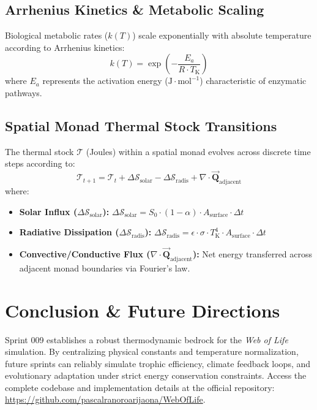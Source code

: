 \documentclass[11pt, a4paper]{article}
\begin{document}
\subsection{Arrhenius Kinetics \& Metabolic Scaling}
Biological metabolic rates ($k(T)$) scale exponentially with absolute temperature according to Arrhenius kinetics:
\begin{equation}
k(T) = \exp\left( -\frac{E_a}{R \cdot T_{\text{K}}} \right)
\end{equation}
where $E_a$ represents the activation energy ($\text{J}\cdot\text{mol}^{-1}$) characteristic of enzymatic pathways.

\subsection{Spatial Monad Thermal Stock Transitions}
The thermal stock $\mathcal{T}$ (Joules) within a spatial monad evolves across discrete time steps according to:
\begin{equation}
\mathcal{T}_{t+1} = \mathcal{T}_{t} + \Delta \mathcal{S}_{\text{solar}} - \Delta \mathcal{S}_{\text{radis}} + \nabla \cdot \vec{\mathbf{Q}}_{\text{adjacent}}
\end{equation}
where:
\begin{itemize}
    \item \textbf{Solar Influx ($\Delta \mathcal{S}_{\text{solar}}$):} $\Delta \mathcal{S}_{\text{solar}} = S_0 \cdot (1 - \alpha) \cdot A_{\text{surface}} \cdot \Delta t$
    \item \textbf{Radiative Dissipation ($\Delta \mathcal{S}_{\text{radis}}$):} $\Delta \mathcal{S}_{\text{radis}} = \epsilon \cdot \sigma \cdot T_{\text{K}}^4 \cdot A_{\text{surface}} \cdot \Delta t$
    \item \textbf{Convective/Conductive Flux ($\nabla \cdot \vec{\mathbf{Q}}_{\text{adjacent}}$):} Net energy transferred across adjacent monad boundaries via Fourier's law.
\end{itemize}

\section{Conclusion \& Future Directions}
Sprint 009 establishes a robust thermodynamic bedrock for the \textit{Web of Life} simulation. By centralizing physical constants and temperature normalization, future sprints can reliably simulate trophic efficiency, climate feedback loops, and evolutionary adaptation under strict energy conservation constraints. Access the complete codebase and implementation details at the official repository: \url{https://github.com/pascalranoroarijaona/WebOfLife}.
\end{document}
